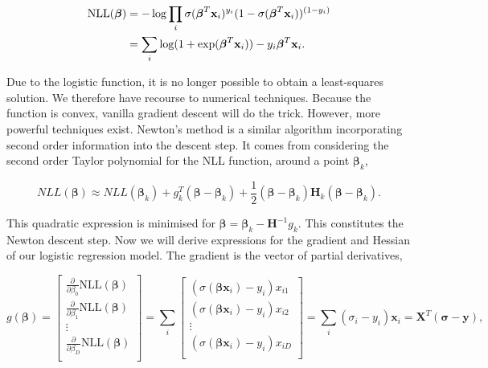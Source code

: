 \documentclass[11pt]{amsart}
\begin{document}
\begin{align}
\text{NLL}(\boldsymbol\beta) &= -\log\prod_i \sigma(\boldsymbol\beta^T\mathbf{x}_i)^{y_i}(1 - \sigma(\boldsymbol\beta^T\mathbf{x}_i))^{(1 - y_i)} \notag \\
&= \sum_i \log(1 + \exp(\boldsymbol\beta^T\mathbf{x}_i)) - y_i\boldsymbol\beta^T\mathbf{x}_i.\notag
\end{align}

Due to the logistic function, it is no longer possible to obtain a least-squares solution. We therefore have recourse to numerical techniques. Because the function is convex, vanilla gradient descent will do the trick. However, more powerful techniques exist. Newton's method is a similar algorithm incorporating second order information into the descent step. It comes from considering the second order Taylor polynomial for the NLL function, around a point $\boldsymbol\beta_k$,

$$NLL(\boldsymbol\beta) \approx NLL(\boldsymbol\beta_k) + g_k^T(\boldsymbol\beta - \boldsymbol\beta_k) + \frac{1}{2}(\boldsymbol\beta - \boldsymbol\beta_k)\mathbf{H}_k(\boldsymbol\beta - \boldsymbol\beta_k).$$

This quadratic expression is minimised for $\boldsymbol\beta = \boldsymbol\beta_k - \mathbf{H}^{-1}g_k$. This constitutes the Newton descent step. Now we will derive expressions for the gradient and Hessian of our logistic regression model. The gradient is the vector of partial derivatives,

$$g(\boldsymbol\beta) = \begin{bmatrix}
\frac{\partial}{\partial \beta_0} \text{NLL}(\boldsymbol\beta) \\
\frac{\partial}{\partial \beta_1} \text{NLL}(\boldsymbol\beta) \\
\vdots \\
\frac{\partial}{\partial \beta_D} \text{NLL}(\boldsymbol\beta) \\
\end{bmatrix} =
\sum_i \begin{bmatrix}
(\sigma(\boldsymbol\beta\mathbf{x}_i) - y_i)x_{i1} \\
(\sigma(\boldsymbol\beta\mathbf{x}_i) - y_i)x_{i2} \\
\vdots \\
(\sigma(\boldsymbol\beta\mathbf{x}_i) - y_i)x_{iD} \\
\end{bmatrix}
= \sum_i (\sigma_i - y_i)\mathbf{x}_i = \mathbf{X}^T(\boldsymbol\sigma - \mathbf{y}),
$$
\end{document}
